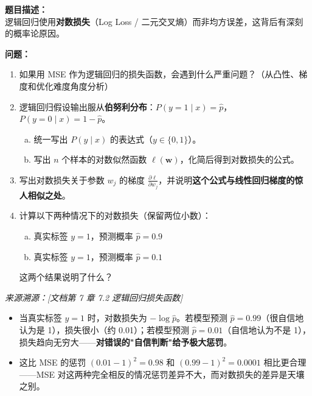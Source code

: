 \documentclass[a4paper,11pt]{ctexart}
\begin{document}
\begin{problembox}
    \textbf{题目描述：}\\
    逻辑回归使用\textbf{对数损失}（Log Loss / 二元交叉熵）而非均方误差，这背后有深刻的概率论原因。

    \vspace{0.3cm}
    \textbf{问题：}
    \begin{enumerate}[(1)]
        \item 如果用 MSE 作为逻辑回归的损失函数，会遇到什么严重问题？（从凸性、梯度和优化难度角度分析）

        \item 逻辑回归假设输出服从\textbf{伯努利分布}：$P(y=1\mid x) = \hat{p}$，$P(y=0\mid x) = 1-\hat{p}$。
        \begin{enumerate}[a.]
            \item 统一写出 $P(y\mid x)$ 的表达式（$y\in\{0,1\}$）。
            \item 写出 $n$ 个样本的对数似然函数 $\ell(\boldsymbol{w})$，化简后得到对数损失的公式。
        \end{enumerate}

        \item 写出对数损失关于参数 $w_j$ 的梯度 $\frac{\partial \ell}{\partial w_j}$，并说明\textbf{这个公式与线性回归梯度的惊人相似之处}。

        \item 计算以下两种情况下的对数损失（保留两位小数）：
        \begin{enumerate}[a.]
            \item 真实标签 $y=1$，预测概率 $\hat{p}=0.9$
            \item 真实标签 $y=1$，预测概率 $\hat{p}=0.1$
        \end{enumerate}
        这两个结果说明了什么？
    \end{enumerate}
    {\color{gray}\small\textit{来源溯源：[文档第 7 章 7.2 逻辑回归损失函数]}}
\end{problembox}

\begin{beginnerbox}
    \begin{itemize}
        \item 当真实标签 $y=1$ 时，对数损失为 $-\log\hat{p}$。若模型预测 $\hat{p}=0.99$（很自信地认为是 1），损失很小（约 0.01）；若模型预测 $\hat{p}=0.01$（自信地认为不是 1），损失趋向无穷大——\textbf{对错误的"自信判断"给予极大惩罚}。
        \item 这比 MSE 的惩罚 $(0.01-1)^2=0.98$ 和 $(0.99-1)^2=0.0001$ 相比更合理——MSE 对这两种完全相反的情况惩罚差异不大，而对数损失的差异是天壤之别。
    \end{itemize}
\end{beginnerbox}
\end{document}
